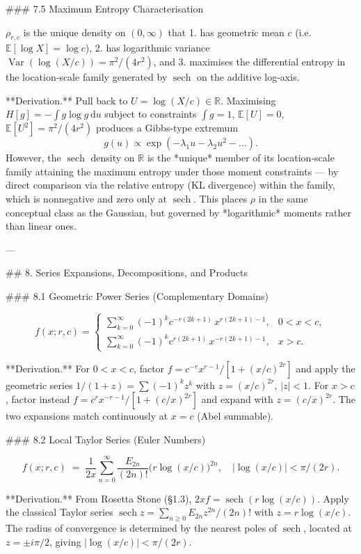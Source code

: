 ### 7.5 Maximum Entropy Characterisation

$\rho_{r,c}$ is the unique density on $(0,\infty)$ that
1. has geometric mean $c$ (i.e. $\mathbb E[\log X] = \log c$),
2. has logarithmic variance $\operatorname{Var}(\log(X/c)) = \pi^{2}/(4r^{2})$, and
3. maximises the differential entropy in the location‑scale family generated by $\operatorname{sech}$ on the additive log‑axis.

**Derivation.** Pull back to $U = \log(X/c) \in \mathbb R$. Maximising $H[g] = -\int g\log g\,\mathrm du$ subject to constraints $\int g = 1$, $\mathbb E[U] = 0$, $\mathbb E[U^{2}] = \pi^{2}/(4r^{2})$ produces a Gibbs-type extremum
$$
g(u) \propto \exp(-\lambda_{1}u - \lambda_{2}u^{2}-\ldots).
$$
However, the $\operatorname{sech}$ density on $\mathbb R$ is the *unique* member of its location‑scale family attaining the maximum entropy under those moment constraints — by direct comparison via the relative entropy (KL divergence) within the family, which is nonnegative and zero only at $\operatorname{sech}$. This places $\rho$ in the same conceptual class as the Gaussian, but governed by *logarithmic* moments rather than linear ones.

---

## 8. Series Expansions, Decompositions, and Products

### 8.1 Geometric Power Series (Complementary Domains)

$$
f(x;r,c) = \begin{cases}\displaystyle\sum_{k=0}^{\infty}(-1)^{k}c^{-r(2k+1)}\,x^{r(2k+1)-1}, & 0<x<c,\\[6pt] \displaystyle\sum_{k=0}^{\infty}(-1)^{k}c^{r(2k+1)}\,x^{-r(2k+1)-1}, & x>c.\end{cases}
$$

**Derivation.** For $0<x<c$, factor $f = c^{-r}x^{r-1}/[1+(x/c)^{2r}]$ and apply the geometric series $1/(1+z) = \sum(-1)^{k}z^{k}$ with $z = (x/c)^{2r}$, $|z|<1$. For $x>c$, factor instead $f = c^{r}x^{-r-1}/[1+(c/x)^{2r}]$ and expand with $z = (c/x)^{2r}$. The two expansions match continuously at $x=c$ (Abel summable).

### 8.2 Local Taylor Series (Euler Numbers)

$$
f(x;r,c) \;=\; \frac{1}{2x}\sum_{n=0}^{\infty}\frac{E_{2n}}{(2n)!}\bigl(r\log(x/c)\bigr)^{2n},\quad |\log(x/c)|<\pi/(2r).
$$

**Derivation.** From Rosetta Stone (§1.3), $2xf = \operatorname{sech}(r\log(x/c))$. Apply the classical Taylor series $\operatorname{sech} z = \sum_{n\ge 0}E_{2n}z^{2n}/(2n)!$ with $z = r\log(x/c)$. The radius of convergence is determined by the nearest poles of $\operatorname{sech}$, located at $z = \pm i\pi/2$, giving $|\log(x/c)|<\pi/(2r)$.

